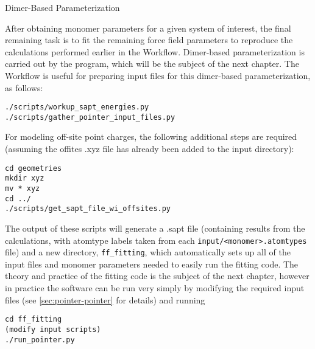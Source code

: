 \begin{section}{Dimer-Based Parameterization}
\label{sec:workflow-dimer_parameters}

After obtaining monomer parameters for a given system of interest, the final
remaining task is to fit the remaining force field parameters to reproduce the
\dftsapt calculations performed earlier in the Workflow. Dimer-based
parameterization is carried out by the \pointer program, which will be the
subject of the next chapter. The Workflow is useful for preparing input
files for this dimer-based parameterization, as follows:
%
\begin{lstlisting}
./scripts/workup_sapt_energies.py
./scripts/gather_pointer_input_files.py
\end{lstlisting}
%
For modeling off-site point charges, the following additional steps are
required (assuming the offites .xyz file has already been added to the input
directory):
\begin{lstlisting}
cd geometries
mkdir xyz
mv * xyz
cd ../
./scripts/get_sapt_file_wi_offsites.py
\end{lstlisting}
%
The output of these scripts will generate a .sapt file (containing results
from the \dftsapt calculations, with atomtype
labels taken from each \verb|input/<monomer>.atomtypes| file) and a new
directory, \verb|ff_fitting|, which automatically sets up all of the input files and monomer
parameters needed to easily run the \pointer fitting code. The theory and
practice of the \pointer fitting code is the subject of the next chapter,
however in practice the software can be run very simply by modifying the
required input files (see \cref{sec:pointer-pointer} for details) and running
\begin{lstlisting}
cd ff_fitting
(modify input scripts)
./run_pointer.py
\end{lstlisting}

\end{section}


